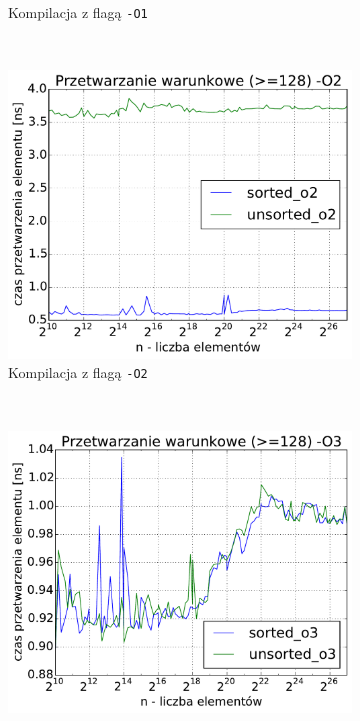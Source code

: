 \begin{figure}[!h]
\begin{subfigure}[c]{0.45\textwidth}
        \caption{Kompilacja z flagą \texttt{-O1}}
    \end{subfigure}
    \\
    \vspace{0.55cm}
    \begin{subfigure}[c]{0.45\textwidth}
        \centering
        \includegraphics[width=\textwidth]{images/benchs_xeon/filtered_sum_O2}
        \caption{Kompilacja z flagą \texttt{-O2}}
    \end{subfigure}
    ~
    \begin{subfigure}[c]{0.45\textwidth}
        \centering
        \includegraphics[width=\textwidth]{images/benchs_xeon/filtered_sum_O3}

\end{subfigure}
\end{figure}
